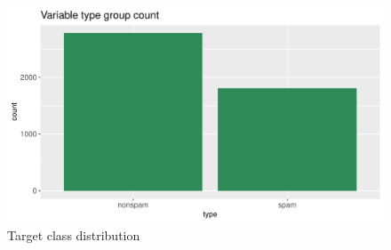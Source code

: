 \documentclass{article}\usepackage[]{graphicx}\usepackage[]{xcolor}
\makeatletter
\def\maxwidth{ %
  \ifdim\Gin@nat@width>\linewidth
    \linewidth
  \else
    \Gin@nat@width
  \fi
}
\newenvironment{knitrout}{}{} %
\makeatother
\begin{document}
\begin{knitrout}
\color{fgcolor}\begin{figure}[h]
\includegraphics[width=\maxwidth]{figure/tgtClassPlot-1} \caption[\label{fig1} Target class distribution]{\label{fig1} Target class distribution}\label{fig:tgtClassPlot}
\end{figure}

\end{knitrout}
\end{document}
